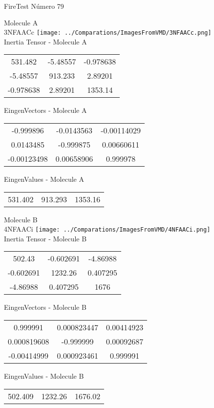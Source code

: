 \vtab[-2cm]
\begin{center}
{\large FireTest \tab Número 79}
\end{center}
\begin{multicols}{2}
\begin{center}

Molecule A \\ 
3NFAACc
\texttt{[image: ../Comparations/ImagesFromVMD/3NFAACc.png]}
\\
Inertia Tensor - Molecule A \\
\vtab

\begin{tabular}{|c c c|}
531.482	 & 	-5.48557	 & 	-0.978638	 \\
-5.48557	 & 	913.233	 & 	2.89201	 \\
-0.978638	 & 	2.89201	 & 	1353.14
\end{tabular}

\vtab
 EingenVectors - Molecule A     \\
\vtab
\begin{tabular}{|c c c|}
-0.999896	 & 	-0.0143563	 & 	-0.00114029	 \\
0.0143485	 & 	-0.999875	 & 	0.00660611	 \\
-0.00123498	 & 	0.00658906	 & 	0.999978
\end{tabular}

\vtab
 EingenValues - Molecule A     \\
\vtab
\begin{tabular}{|c c c|}
531.402	 & 	913.293	 & 	1353.16	 \\
\end{tabular}
\columnbreak

Molecule B \\ 
4NFAACi
\texttt{[image: ../Comparations/ImagesFromVMD/4NFAACi.png]}
\\
Inertia Tensor - Molecule B \\
\vtab

\begin{tabular}{|c c c|}
502.43	 & 	-0.602691	 & 	-4.86988	 \\
-0.602691	 & 	1232.26	 & 	0.407295	 \\
-4.86988	 & 	0.407295	 & 	1676
\end{tabular}

\vtab
 EingenVectors - Molecule B     \\
\vtab
\begin{tabular}{|c c c|}
0.999991	 & 	0.000823447	 & 	0.00414923	 \\
0.000819608	 & 	-0.999999	 & 	0.00092687	 \\
-0.00414999	 & 	0.000923461	 & 	0.999991
\end{tabular}

\vtab
 EingenValues - Molecule B     \\
\vtab
\begin{tabular}{|c c c|}
502.409	 & 	1232.26	 & 	1676.02	 \\
\end{tabular}

\end{center}
\end{multicols}
